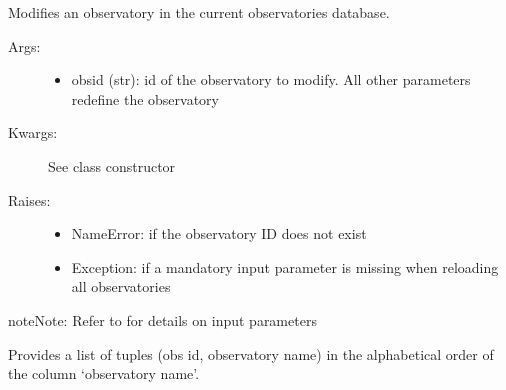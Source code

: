 \documentclass[letterpaper,10pt,english]{sphinxmanual}
\begin{document}
\begin{fulllineitems}
\begin{fulllineitems}
\label{astroobs:astroobs.ObservatoryList.ObservatoryList.mod}
Modifies an observatory in the current observatories database.
\begin{description}
\item[{Args:}] \leavevmode\begin{itemize}
\item {} 
obsid (str): id of the observatory to modify. All other parameters redefine the observatory

\end{itemize}

\item[{Kwargs:}] \leavevmode
See class constructor

\item[{Raises:}] \leavevmode\begin{itemize}
\item {} 
NameError: if the observatory ID does not exist

\item {} 
Exception: if a mandatory input parameter is missing when reloading all observatories

\end{itemize}

\end{description}

\begin{notice}{note}{Note:}
Refer to  for details on input parameters
\end{notice}

\end{fulllineitems}


\begin{fulllineitems}
\label{astroobs:astroobs.ObservatoryList.ObservatoryList.nameList}
Provides a list of tuples (obs id, observatory name) in the alphabetical order of the column `observatory name'.

\end{fulllineitems}



\end{fulllineitems}
\end{document}
